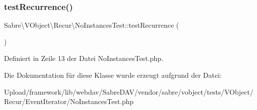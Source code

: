 \subsubsection{\texorpdfstring{test\+Recurrence()}{testRecurrence()}}
{\footnotesize\ttfamily Sabre\textbackslash{}\+V\+Object\textbackslash{}\+Recur\textbackslash{}\+No\+Instances\+Test\+::test\+Recurrence (\begin{DoxyParamCaption}{ }\end{DoxyParamCaption})}



Definiert in Zeile 13 der Datei No\+Instances\+Test.\+php.



Die Dokumentation für diese Klasse wurde erzeugt aufgrund der Datei\+:\begin{DoxyCompactItemize}
\item 
Upload/framework/lib/webdav/\+Sabre\+D\+A\+V/vendor/sabre/vobject/tests/\+V\+Object/\+Recur/\+Event\+Iterator/No\+Instances\+Test.\+php\end{DoxyCompactItemize}
